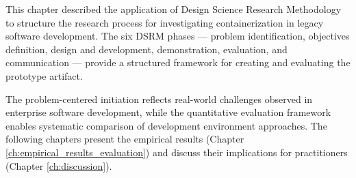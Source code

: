 This chapter described the application of Design Science Research Methodology to structure the research process for investigating containerization in legacy software development.
The six DSRM phases --- problem identification, objectives definition, design and development, demonstration, evaluation, and communication --- provide a structured framework for creating and evaluating the prototype artifact.

The problem-centered initiation reflects real-world challenges observed in enterprise software development, while the quantitative evaluation framework enables systematic comparison of development environment approaches.
The following chapters present the empirical results (Chapter \ref{ch:empirical_results_evaluation}) and discuss their implications for practitioners (Chapter \ref{ch:discussion}).
